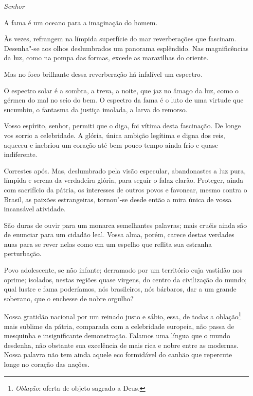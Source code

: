 \begin{linenumbers}

\noindent\textit{Senhor}\smallskip

A fama é um oceano para a imaginação do homem.

Às vezes, refrangem na límpida superfície do mar reverberações que
fascinam. Desenha"-se aos olhos deslumbrados um panorama esplêndido.
Nas magnificências da luz, como na pompa das formas, excede as
maravilhas do oriente. 

Mas no foco brilhante dessa reverberação há infalível um espectro.

O espectro solar é a sombra, a treva, a noite, que jaz no âmago da luz,
como o gérmen do mal no seio do bem. O espectro da fama é o luto de uma
virtude que sucumbiu, o fantasma da justiça imolada, a larva do remorso. 

Vosso espírito, senhor, permiti que o diga, foi vítima desta fascinação.
De longe vos sorrio a celebridade. A glória, única ambição legítima e
digna dos reis, aqueceu e inebriou um coração até bem pouco tempo
ainda frio e quase indiferente. 

Correstes após. Mas, deslumbrado pela visão especular, abandonastes a
luz pura, límpida e serena da verdadeira glória, para seguir o falaz
clarão. Proteger, ainda com sacrifício da pátria, os interesses de
outros povos e favonear, mesmo contra o Brasil, as paixões
estrangeiras, tornou"-se desde então a mira única de vossa incansável atividade. \label{incansavel}

São duras de ouvir para um monarca semelhantes palavras; mais cruéis
ainda são de enunciar para um cidadão leal. Vossa alma, porém, carece
destas verdades nuas para se rever nelas como em um espelho que reflita
sua estranha perturbação.

Povo adolescente, se não infante; derramado por um território cuja
vastidão nos oprime; isolados, nestas regiões quase virgens, do centro
da civilização do mundo; qual lustre e fama poderíamos, nós
brasileiros, nós bárbaros, dar a um grande soberano, que o enchesse de
nobre orgulho? 

Nossa gratidão nacional por um reinado justo e sábio, essa, de todas a
oblação\footnote{ \textit{Oblação}: oferta de objeto sagrado a Deus.}
 mais sublime da pátria, comparada com a celebridade europeia, não passa
de mesquinha e insignificante demonstração. Falamos uma língua que o
mundo desdenha, não obstante sua excelência de mais rica e nobre entre
as modernas. Nossa palavra não tem ainda aquele eco formidável do
canhão que repercute longe no coração das nações.


\end{linenumbers}
